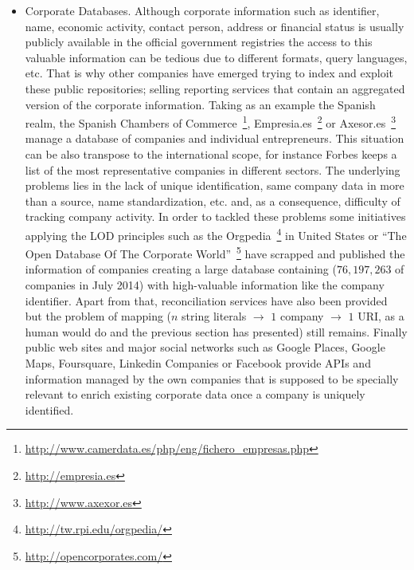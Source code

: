 \documentclass[1p,12pt]{elsarticle}
\begin{document}
\begin{itemize}
 
 \item Corporate Databases. Although corporate information such as identifier, name, economic activity, contact person, address or 
 financial status is usually publicly available in the official government registries the access to this valuable information can be 
 tedious due to different formats, query languages, etc. That is why other companies have emerged trying to index and exploit 
 these public repositories; selling reporting services that contain an aggregated version of the corporate information. Taking as 
 an example the Spanish realm, the Spanish Chambers of Commerce~\footnote{\url{http://www.camerdata.es/php/eng/fichero\_empresas.php}},
 Empresia.es~\footnote{\url{http://empresia.es}} or Axesor.es~\footnote{\url{http://www.axexor.es}} manage a database of companies and individual 
 entrepreneurs. This situation can be also transpose to the international scope, for instance Forbes keeps a list of 
 the most representative companies in different sectors. The underlying problems lies in the lack of unique identification, same company data in more 
 than a source, name standardization, etc. and, as a consequence, difficulty of tracking company activity. In order to tackled these problems some 
 initiatives applying the LOD principles such as the Orgpedia~\footnote{\url{http://tw.rpi.edu/orgpedia/}} in United States or 
 ``The Open Database Of The Corporate World''~\footnote{\url{http://opencorporates.com/}} have scrapped and published the information 
 of companies creating a large database containing ($76,197,263$ of companies in July 2014) with high-valuable information like the company 
 identifier. Apart from that, reconciliation services have also been provided but the problem of mapping ($n$ string literals $\to$ $1$ company $\to$ $1$ URI, 
 as a human would do and the previous section has presented) still remains. Finally public web sites and major social networks such as Google 
 Places, Google Maps, Foursquare, Linkedin Companies or Facebook provide APIs and information managed by the own companies that is supposed 
 to be specially relevant to enrich existing corporate data once a company is uniquely identified.
 
\end{itemize}
\end{document}
